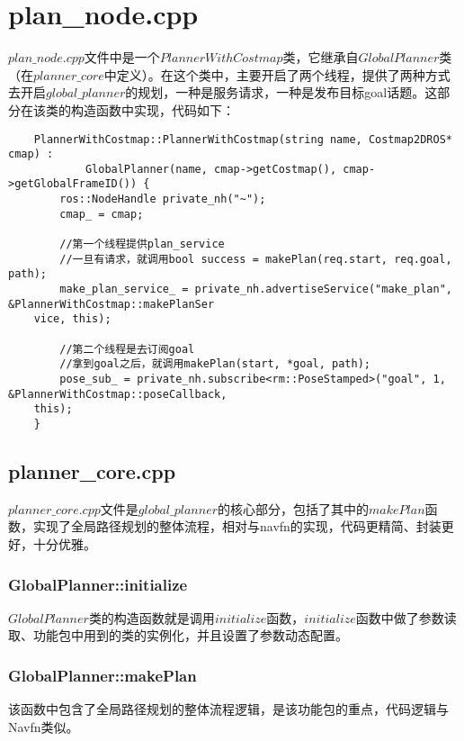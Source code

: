 \documentclass[9pt, oneside]{book}
\begin{document}
\section{plan\_node.cpp}

$plan\_node.cpp$文件中是一个$PlannerWithCostmap$类，它继承自$GlobalPlanner$类（在$planner\_core$中定义）。在这个类中，主要开启了两个线程，提供了两种方式去开启$global\_planner$的规划，一种是服务请求，一种是发布目标goal话题。这部分在该类的构造函数中实现，代码如下：

\footnotesize
\begin{verbatim}
    PlannerWithCostmap::PlannerWithCostmap(string name, Costmap2DROS* cmap) :
            GlobalPlanner(name, cmap->getCostmap(), cmap->getGlobalFrameID()) {
        ros::NodeHandle private_nh("~");
        cmap_ = cmap;

        //第一个线程提供plan_service
        //一旦有请求，就调用bool success = makePlan(req.start, req.goal, path);
        make_plan_service_ = private_nh.advertiseService("make_plan", &PlannerWithCostmap::makePlanSer
    vice, this);

        //第二个线程是去订阅goal
        //拿到goal之后，就调用makePlan(start, *goal, path);
        pose_sub_ = private_nh.subscribe<rm::PoseStamped>("goal", 1, &PlannerWithCostmap::poseCallback, 
    this);
    }
\end{verbatim}
\normalsize

\subsection{planner\_core.cpp}

$planner\_core.cpp$文件是$global\_planner$的核心部分，包括了其中的$makePlan$函数，实现了全局路径规划的整体流程，相对与navfn的实现，代码更精简、封装更好，十分优雅。

\subsubsection{GlobalPlanner::initialize}

$GlobalPlanner$类的构造函数就是调用$initialize$函数，$initialize$函数中做了参数读取、功能包中用到的类的实例化，并且设置了参数动态配置。

\subsubsection{GlobalPlanner::makePlan}

该函数中包含了全局路径规划的整体流程逻辑，是该功能包的重点，代码逻辑与Navfn类似。
\end{document}
